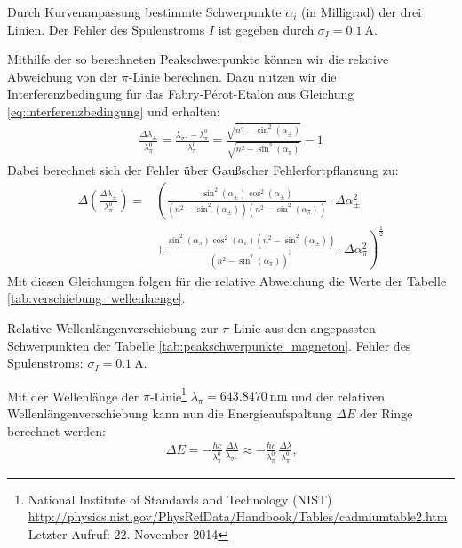 \documentclass[11pt, a4paper]{article}
\begin{document}
\begin{table}[h]
	\centering
	\resizebox{\columnwidth}{!}{%
		}
	\caption{Durch Kurvenanpassung bestimmte Schwerpunkte $\alpha_i$ (in Milligrad) der drei Linien. Der Fehler des Spulenstroms $I$ ist gegeben durch $\sigma_I = \SI{0.1}{\ampere}$.}
	\label{tab:peakschwerpunkte_magneton}
\end{table}

Mithilfe der so berechneten Peakschwerpunkte können wir die relative Abweichung von der $\pi$-Linie berechnen.
Dazu nutzen wir die Interferenzbedingung für das Fabry-Pérot-Etalon aus Gleichung \ref{eq:interferenzbedingung} und erhalten:
\begin{align}
	\frac{\Delta \lambda_\pm}{\lambda_\pi^0} = \frac{\lambda_{\sigma^\pm} - \lambda_\pi^0}{\lambda_\pi^0} = \frac{\sqrt{n^2 - \sin^2(\alpha_{\pm})}}{\sqrt{n^2 - \sin^2(\alpha_\pi)}} - 1
\end{align}
Dabei berechnet sich der  Fehler über Gaußscher Fehlerfortpflanzung zu:
\begin{align}
	\Delta \left( \frac{\Delta \lambda_\pm}{\lambda_\pi^0} \right) = & \left( \frac{\sin^2(\alpha_\pm) \cos^2(\alpha_\pm)}{(n^2-\sin^2(\alpha_\pm))(n^2-\sin^2(\alpha_\pi))} \cdot \Delta \alpha_\pm^2 \right. \nonumber\\
	& \left. + \frac{\sin^2(\alpha_\pi) \cos^2(\alpha_\pi) (n^2 - \sin^2(\alpha_\pm))}{(n^2-\sin^2(\alpha_\pi))^3} \cdot \Delta \alpha_\pi^2\right)^\frac{1}{2}
\end{align}
Mit diesen Gleichungen folgen für die relative Abweichung die Werte der Tabelle \ref{tab:verschiebung_wellenlaenge}. 
\begin{table}[h]
	\centering
	
	\caption{Relative Wellenlängenverschiebung zur $\pi$-Linie aus den angepassten Schwerpunkten der Tabelle \ref{tab:peakschwerpunkte_magneton}. Fehler des Spulenstroms: $\sigma_I = \SI{0.1}{\ampere}$.}
	\label{tab:verschiebung_wellenlaenge}
\end{table}
Mit der Wellenlänge der $\pi$-Linie\footnote{National Institute of Standards and Technology (NIST)\\ \url{http://physics.nist.gov/PhysRefData/Handbook/Tables/cadmiumtable2.htm}\\Letzter Aufruf: 22. November 2014} $\lambda_\pi = \SI{643,8470}{\nano\metre}$  und der relativen Wellenlängenverschiebung kann nun die Energieaufspaltung $\Delta E$ der Ringe berechnet werden:
\begin{align}
	\Delta E = -\frac{h c}{\lambda_\pi^0}\,\frac{\Delta \lambda}{\lambda_{\sigma^\pm}} \approx -\frac{h c}{\lambda_\pi^0}\,\frac{\Delta \lambda}{\lambda_\pi^0} \text{,}
\end{align}
\end{document}

